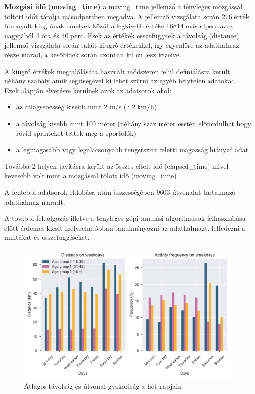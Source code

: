 \textbf{Mozgási idő (moving\_time)}
a moving\_time jellemző a tényleges mozgással töltött időt tárolja másodpercben megadva. A jellemző vizsgálata során 276 érték bizonyult kiugrónak amelyek közül a legkisebb értéke 16814 másodperc azaz nagyjából 4 óra és 40 perc. Ezek az értékek összefüggnek a távolság (distance) jellemző vizsgálata során talált kiugró értékekkel, így egyenlőre az adathalmaz része marad, a későbbiek során azonban külön lesz kezelve.


A kiugró értékek megtalálására használt módszeren felül definiálásra került néhány szabály amik segítségével ki lehet szűrni az egyéb helytelen adatokat. Ezek alapján elvetésre kerülnek azok az adatsorok ahol:
\begin{itemize}
	\item az átlagsebesség kisebb mint 2 m/s (7.2 km/h)
	\item a távolság kisebb mint 100 méter (néhány száz méter esetén előfordulhat hogy rövid sprinteket tettek meg a sportolók)
	\item a legmagasabb vagy legalacsonyabb tengerszint feletti magasság hiányzó adat
\end{itemize} 
Továbbá 2 helyen javításra került az összes eltelt idő (elapsed\_time) mivel kevesebb volt mint a mozgással tölött idő (moving\_time)


A fentebbi adatsorok eldobása után összességében 9603 útvonalat tartalmazó adathalmaz maradt.


A további feldolgozás illetve a tényleges gépi tanulási algoritmusok felhasználása előtt érdemes kicsit mélyrehatóbban tanulmányozni az adathalmazt, felfedezni a mintákat és összefüggéseket. 



\begin{figure}
	\includegraphics[width=\linewidth]{kepek/FrequencyAndDistanceOnWeekDays.png}
	\caption{Átlagos távolság és útvonal gyakoriság a hét napjain}
	\label{fig:distanceAndFrequencyByWeekdays}
\end{figure}

